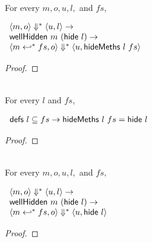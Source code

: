 \begin{lemma}
  \label{lem-inlinedmssubo}
  \mbox{}\\
  For every $m, o, u, l,$ and $fs,$
  \begin{center}
    \begin{math}
      \begin{array}{l}
        \langle m, o \rangle \Downarrow^{\ast} \langle u, l \rangle \to \\
        \textsf{wellHidden}\ m\ (\textsf{hide}{}\ l) \to \\
        \langle m \hookleftarrow^{\ast}{} fs, o \rangle \Downarrow^{\ast} \langle u, \textsf{hideMeths}{}\ l\ fs \rangle
      \end{array}
    \end{math}
  \end{center}
\end{lemma}
\begin{proof}
\end{proof}

\begin{lemma}
  \label{lem-hidemeths}
  \mbox{}\\
  For every $l$ and $fs$,
  \begin{center}
    \begin{math}
      \begin{array}{l}
        \textsf{defs}\ l \subseteq fs \to \textsf{hideMeths}{}\ l\ fs = \textsf{hide}{}\ l
      \end{array}
    \end{math}
  \end{center}
\end{lemma}
\begin{proof}
\end{proof}

\begin{lemma}
  \label{lem-inlinedmssub}
  \mbox{}\\
  For every $m, o, u, l,$ and $fs,$
  \begin{center}
    \begin{math}
      \begin{array}{l}
        \langle m, o \rangle \Downarrow^{\ast} \langle u, l \rangle \to \\
        \textsf{wellHidden}\ m\ (\textsf{hide}{}\ l) \to \\
        \langle m \hookleftarrow^{\ast}{} fs, o \rangle \Downarrow^{\ast} \langle u, \textsf{hide}{}\ l \rangle
      \end{array}
    \end{math}
  \end{center}
\end{lemma}
\begin{proof}
\end{proof}

